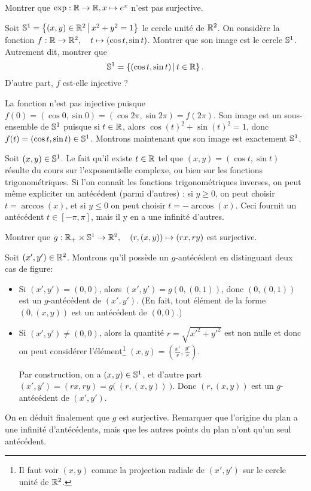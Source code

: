 \begin{exercice}
Montrer que  $\exp: \R\to \R, x\mapsto e^x$ n'est pas surjective.
\end{exercice}


\begin{exercice}\label{exo-param-cercle}
Soit $\S^1 = \ensemble{(x,y)\in \R^2}{x^2+y^2=1}$ le cercle unité de $\R^2$. On considère la fonction $f : \R\to \R^2, \quad t\mapsto (\cos t, \sin t)$. Montrer que son image est le cercle $\S^1$. Autrement dit, montrer que
\[ \S^1=\ensemble{(\cos t, \sin t)}{t\in \R}.\]
D'autre part, $f$ est-elle injective ?
\end{exercice}
\begin{red}
La fonction n'est pas injective puisque $f(0)=(\cos 0, \sin 0) = (\cos2\pi, \sin 2\pi) = f(2\pi)$. Son image est un sous-ensemble de $\S^1$ puisque si $t\in \R$, alors $\cos(t)^2+\sin(t)^2=1$, donc $f(t)=(\cos t,\sin t) \in \S^1$. Montrons maintenant que son image est exactement $\S^1$.

Soit $(x,y)\in \S^1$. Le fait qu'il existe $t\in \R$ tel que $(x,y)=(\cos t,\sin t) $ résulte du cours sur l'exponentielle complexe, ou bien sur les fonctions trigonométriques. Si l'on connaît les fonctions trigonométriques inverses, on peut même expliciter un antécédent (parmi d'autres) : si $y\geq 0$, on peut choisir $t=\arccos(x)$, et si $y\leq 0$ on peut choisir $t=-\arccos(x)$. Ceci fournit un antécédent $t\in [-\pi,\pi]$, mais il y en a une infinité d'autres.
\end{red}


\begin{exercice}\label{exo-decomp-polaire}
Montrer que $g : \R_+\times \S^1 \to \R^2, \quad (r,(x,y))\mapsto (rx,ry)$ est surjective.
\end{exercice}
\begin{red}
Soit $(x',y')\in \R^2$. Montrons qu'il possède un $g$-antécédent en distinguant deux cas de figure:
\begin{itemize}
\item Si $(x',y')=(0,0)$, alors $(x',y')=g(0,(0,1))$, donc $(0,(0,1))$ est un $g$-antécédent de $(x',y')$. (En fait, tout élément de la forme $(0,(x,y))$ est un antécédent de $(0,0)$.)
\item Si $(x',y')\neq (0,0)$, alors la quantité $r=\sqrt{x'^2+y'^2}$ est non nulle et donc on peut considérer l'élément\footnote{Il faut  voir $(x,y)$ comme la projection radiale de $(x',y')$ sur le cercle unité de $\R^2$.} $(x,y)=\left(\frac{x'}{r},\frac{y'}{r}\right)$.

Par construction, on a $(x,y)\in \S^1$, et d'autre part $(x',y')=(rx,ry)=g\big(\:(r,(x,y))\:\big)$. Donc $(r,(x,y))$ est un $g$-antécédent de $(x',y')$. 
\end{itemize}
On en déduit finalement que $g$ est surjective. Remarquer que l'origine du plan a une infinité d'antécédents, mais que les autres points du plan n'ont qu'un seul antécédent.
\end{red}





